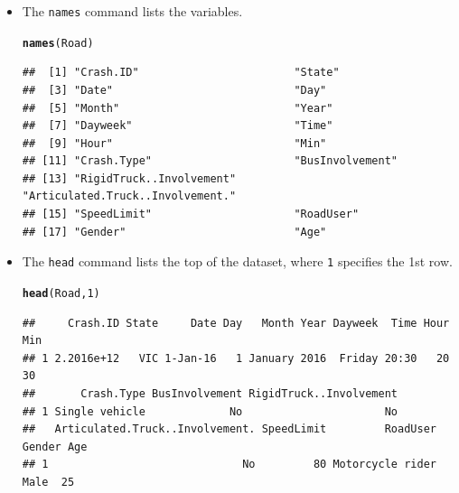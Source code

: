 \documentclass[bigtut]{tutorial}\usepackage[]{graphicx}\usepackage[]{color}
\makeatletter
\newcommand{\hlnum}[1]{\textcolor[rgb]{0.686,0.059,0.569}{#1}}%
\newcommand{\hlstd}[1]{\textcolor[rgb]{0.345,0.345,0.345}{#1}}%
\newcommand{\hlkwd}[1]{\textcolor[rgb]{0.737,0.353,0.396}{\textbf{#1}}}%
\newenvironment{kframe}{%
 \def\at@end@of@kframe{}%
 \ifinner\ifhmode%
  \def\at@end@of@kframe{\end{minipage}}%
  \begin{minipage}{\columnwidth}%
 \fi\fi%
 \def\FrameCommand##1{\hskip\@totalleftmargin \hskip-\fboxsep
 \colorbox{shadecolor}{##1}\hskip-\fboxsep
     \hskip-\linewidth \hskip-\@totalleftmargin \hskip\columnwidth}%
 \MakeFramed {\advance\hsize-\width
   \@totalleftmargin\z@ \linewidth\hsize
   \@setminipage}}%
 {\par\unskip\endMakeFramed%
 \at@end@of@kframe}
\newenvironment{knitrout}{}{} %
\makeatother
\begin{document}
\begin{tutorial}
\begin{questions}
\begin{itemize}
\vspace{.5cm}
\item
The \texttt{names} command lists the variables.
\begin{knitrout}
\color{fgcolor}\begin{kframe}
\begin{alltt}
\hlkwd{names}\hlstd{(Road)}
\end{alltt}
\begin{verbatim}
##  [1] "Crash.ID"                        "State"                          
##  [3] "Date"                            "Day"                            
##  [5] "Month"                           "Year"                           
##  [7] "Dayweek"                         "Time"                           
##  [9] "Hour"                            "Min"                            
## [11] "Crash.Type"                      "BusInvolvement"                 
## [13] "RigidTruck..Involvement"         "Articulated.Truck..Involvement."
## [15] "SpeedLimit"                      "RoadUser"                       
## [17] "Gender"                          "Age"
\end{verbatim}
\end{kframe}
\end{knitrout}

\vspace{.5cm}
\item
The \texttt{head} command lists the top of the dataset, where \texttt{1} specifies the 1st row.
\begin{knitrout}
\color{fgcolor}\begin{kframe}
\begin{alltt}
\hlkwd{head}\hlstd{(Road,}\hlnum{1}\hlstd{)}
\end{alltt}
\begin{verbatim}
##     Crash.ID State     Date Day   Month Year Dayweek  Time Hour Min
## 1 2.2016e+12   VIC 1-Jan-16   1 January 2016  Friday 20:30   20  30
##       Crash.Type BusInvolvement RigidTruck..Involvement
## 1 Single vehicle             No                      No
##   Articulated.Truck..Involvement. SpeedLimit         RoadUser Gender Age
## 1                              No         80 Motorcycle rider   Male  25
\end{verbatim}
\end{kframe}
\end{knitrout}


\end{itemize}
\end{questions}
\end{tutorial}
\end{document}
